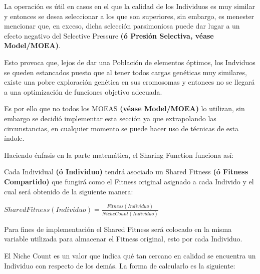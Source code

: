 \documentclass[letterpaper,10pt,english]{sphinxmanual}
\begin{document}
\begin{DUlineblock}{0em}
\item[] La operación es útil en casos en el que la calidad de los Individuos es muy similar y entonces
se desea seleccionar a los que son superiores, sin embargo, es menester mencionar que, en exceso, dicha selección
parsimoniosa puede dar lugar a un efecto negativo del Selective Pressure \textbf{(ó Presión Selectiva, véase Model/MOEA)}.
\item[] Esto provoca que, lejos de dar una Población de elementos óptimos, los Indviduos se queden estancados
puesto que al tener todos cargas genéticas muy similares, existe una pobre exploración genética en
sus cromosomas y entonces no se llegará a una optimización de funciones objetivo adecuada.
\end{DUlineblock}

\begin{DUlineblock}{0em}
\item[] Es por ello que no todos los MOEAS \textbf{(véase Model/MOEA)} lo utilizan, sin embargo se decidió implementar
esta sección ya que extrapolando las circunstancias, en cualquier momento se puede hacer uso de técnicas
de esta índole.
\end{DUlineblock}

\begin{DUlineblock}{0em}
\item[] Haciendo énfasis en la parte matemática, el Sharing Function funciona así:
\end{DUlineblock}

\begin{DUlineblock}{0em}
\item[] Cada Individual \textbf{(ó Individuo)} tendrá asociado un Shared Fitness \textbf{(ó Fitness Compartido)} que fungirá como el
Fitness original asignado a cada Individo y el cual será obtenido de la siguiente manera:
\end{DUlineblock}

\begin{center}\(SharedFitness(Individuo) = \frac{Fitness(Individuo)}{NicheCount(Individuo)}\)
\end{center}
\begin{DUlineblock}{0em}
\item[] Para fines de implementación el Shared Fitness será colocado en la misma variable utilizada para almacenar el Fitness
original, esto por cada Individuo.
\item[] El Niche Count es un valor que indica qué tan cercano en calidad se encuentra un Individuo con respecto de los demás.
La forma de calcularlo es la siguiente:
\end{DUlineblock}
\end{document}
